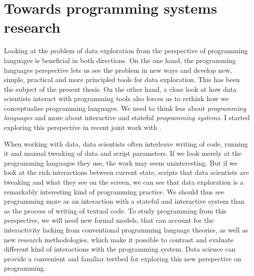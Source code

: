 \documentclass[fleqn,11pt]{report}
\theoremstyle{definition}
\begin{document}
\section{Towards programming systems research}

Looking at the problem of data exploration from the perspective of programming languages
is beneficial in both directions. On the one hand, the programming languages perspective
lets us see the problem in new ways and develop new, simple, practical and more principled
tools for data exploration. This has been the subject of the present thesis. On the other hand,
a close look at how data scientists interact with programming tools also forces us to rethink
how we conceptualise programming languages. We need to think less about \emph{programming languages}
and more about interactive and stateful \emph{programming systems}. I started exploring this
perspective in recent joint work with \cite{jakubovic-2023-techdims}.

When working with data, data scientists often interleave writing of code, running it and
manual tweaking of data and script parameters. If we look merely at the programming languages
they use, the work may seem uninteresting. But if we look at the rich interactions between
current state, scripts that data scientists are tweaking and what they see on the screen,
we can see that data exploration is a remarkably interesting kind of programming practice.
We should thus see programming more as an interaction with a stateful and interactive system
than as the process of writing of textual code. To study programming from this perspective,
we will need new formal models, that can account for the interactivity lacking from
conventional programming language theories, as well as new research methodologies, which
make it possible to contrast and evaluate different kind of interactions with the programming
system. Data science can provide a convenient and familiar testbed for exploring this new
perspective on programming.


%

\end{document}
